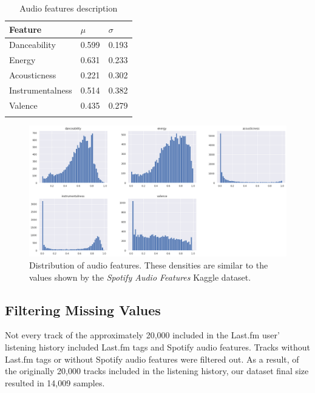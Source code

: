 \documentclass[sn-mathphys]{sn-jnl}%
\theoremstyle{thmstyleone}%
\theoremstyle{thmstyletwo}%
\theoremstyle{thmstylethree}%
\begin{document}
\begin{table}[h!]
      \begin{center}
      \begin{minipage}{\textwidth}
      \caption{Audio features description}\label{table:audio-features-stats}%
      \begin{tabular}{@{}lll@{}}
      \toprule
      Feature           & $\mu$ & $\sigma$ \\
      \midrule
      Danceability      & 0.599  & 0.193  \\
      Energy            & 0.631  & 0.233  \\
      Acousticness      & 0.221  & 0.302  \\
      Instrumentalness  & 0.514  & 0.382  \\
      Valence           & 0.435  & 0.279  \\
      \botrule
      \end{tabular}
      \end{minipage}
      \end{center}
\end{table}

\begin{figure}[h!]
      \centering
      \includegraphics[width=\textwidth]{images/features-distribution.png}
      \caption{Distribution of audio features. These densities are similar to the values shown by the \emph{Spotify Audio Features} Kaggle dataset.}
      \label{fig:audio-features-distribution}
\end{figure}

\subsection{Filtering Missing Values}

Not every track of the approximately 20,000 included in the Last.fm user{'} listening history
included Last.fm tags and Spotify audio features.
Tracks without Last.fm tags or without Spotify audio features were filtered out.
As a result, of the originally 20,000 tracks included in the listening history,
our dataset final size resulted in 14,009 samples.
\end{document}
